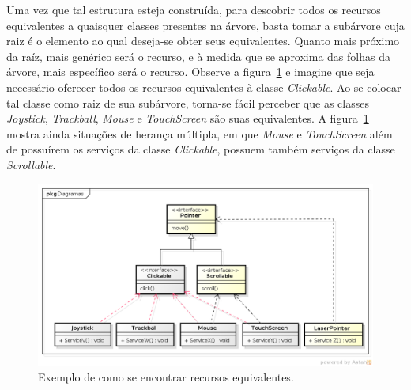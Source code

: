 Uma vez que tal estrutura esteja construída, para descobrir todos os recursos equivalentes a quaisquer classes presentes na árvore, basta tomar a subárvore cuja raiz é o elemento ao qual deseja-se obter seus equivalentes. Quanto mais próximo da raíz, mais genérico será o recurso, e à medida que se aproxima das folhas da árvore, mais específico será o recurso. Observe a figura~\ref{fig:tutorialDeEquivalencia} e imagine que seja necessário oferecer todos os recursos equivalentes à classe \emph{Clickable}. Ao se colocar tal classe como raiz de sua subárvore, torna-se fácil perceber que as classes \emph{Joystick}, \emph{Trackball}, \emph{Mouse} e \emph{TouchScreen} são suas equivalentes. A figura~\ref{fig:tutorialDeEquivalencia} mostra ainda situações de herança múltipla, em que \emph{Mouse} e \emph{TouchScreen} além de possuírem os serviços da classe \emph{Clickable}, possuem também serviços da classe \emph{Scrollable}.

\begin{figure}[ht]
	\center
	\includegraphics[scale=0.55]{imagens/tutorialDeEquivalencia}
	\caption{Exemplo de como se encontrar recursos equivalentes.}
	\label{fig:tutorialDeEquivalencia}
\end{figure}